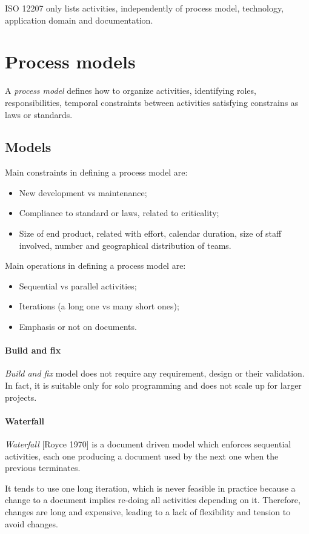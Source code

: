 ISO 12207 only lists activities, independently of process model, technology, application domain and documentation.

\section{Process models}
A \emph{process model} defines how to organize activities, identifying roles, responsibilities, temporal constraints between activities satisfying constrains as laws or standards.

\subsection{Models}
Main constraints in defining a process model are:
\begin{itemize}
\item New development vs maintenance;
\item Compliance to standard or laws, related to criticality;
\item Size of end product, related with effort, calendar duration, size of staff involved, number and geographical distribution of teams.
\end{itemize}
Main operations in defining a process model are:
\begin{itemize}
\item Sequential vs parallel activities;
\item Iterations (a long one vs many short ones);
\item Emphasis or not on documents.
\end{itemize}

\paragraph{Build and fix}
\emph{Build and fix} model does not require any requirement, design or their validation. In fact, it is suitable only for solo programming and does not scale up for larger projects.

\paragraph{Waterfall}
\emph{Waterfall} [Royce 1970] is a document driven model which enforces sequential activities, each one producing a document used by the next one when the previous terminates.

It tends to use one long iteration, which is never feasible in practice because a change to a document implies re-doing all activities depending on it. Therefore, changes are long and expensive, leading to a lack of flexibility and tension to avoid changes.

